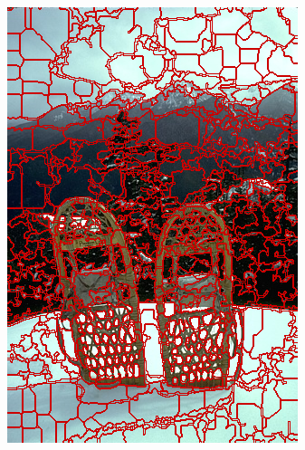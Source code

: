 \begin{figure}
{		\includegraphics[scale=\scalefivebsdtest]{pictures/bsd-test-4-oriseedsmp}
	}
	\subfigure{
}
\end{figure}
